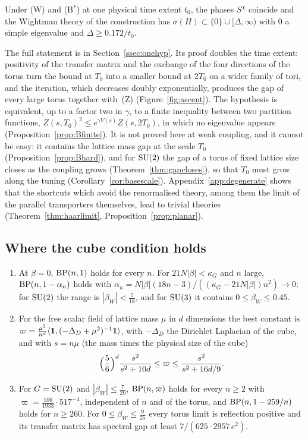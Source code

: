 \begin{mainthmF}
Under \textup{(W)} and \textup{(B$^{*}$)} at one physical time extent $t_0$,
the phases $S^\chi$ coincide and the Wightman theory of the construction has
$\sigma(H)\subset\{0\}\cup[\Delta,\infty)$ with $0$ a simple eigenvalue and
$\Delta\ge0.172/t_0$.
\end{mainthmF}

The full statement is in Section~\ref{ssec:onehyp}. Its proof doubles the
time extent: positivity of the transfer matrix and the exchange of the four
directions of the torus turn the bound at $T_0$ into a smaller bound at
$2T_0$ on a wider family of tori, and the iteration, which decreases doubly
exponentially, produces the gap of every large torus together with~(Z)
(Figure~\ref{fig:ascent}). The hypothesis is equivalent, up to a factor two in $\gamma$, to a finite
inequality between two partition functions,
$Z(s,T_0)^2\le e^{\gamma V(s)}Z(s,2T_0)$, in which no eigenvalue appears
(Proposition~\ref{prop:Bfinite}). It is not proved here at weak coupling,
and it cannot be easy: it contains the lattice mass gap at the scale $T_0$
(Proposition~\ref{prop:Bhard}), and for $\mathrm{SU}(2)$ the gap of a torus of fixed
lattice size closes as the coupling grows (Theorem~\ref{thm:gapcloses}), so
that $T_0$ must grow along the tuning (Corollary~\ref{cor:basescale}).
Appendix~\ref{app:degenerate} shows that the shortcuts which avoid the
renormalised theory, among them the limit of the parallel transporters
themselves, lead to trivial theories (Theorem~\ref{thm:haarlimit},
Proposition~\ref{prop:planar}).

\subsection{Where the cube condition holds}

\begin{mainthm}\label{thm:C}
\begin{enumerate}[label=\textup{(\roman*)},leftmargin=*]
\item At $\beta=0$, $\mathrm{BP}(n,1)$ holds for every $n$. For
$21N|\beta|<\kappa_G$ and $n$ large, $\mathrm{BP}(n,1-\alpha_n)$ holds with
$\alpha_n=N|\beta|(18n-3)/((\kappa_G-21N|\beta|)n^2)\to0$; for $\mathrm{SU}(2)$ the
range is $|\beta_W|<\frac5{18}$, and for $\mathrm{SU}(3)$ it contains
$0\le\beta_W\le0.45$.
\item For the free scalar field of lattice mass $\mu$ in $d$ dimensions the
best constant is
$\varpi=\frac{\mu^2}{n^d}\langle \mathbf 1,(-\Delta_D+\mu^2)^{-1}\mathbf 1\rangle$, with
$-\Delta_D$ the Dirichlet Laplacian of the cube, and with $s=n\mu$ (the mass
times the physical size of the cube)
\[
\Bigl(\frac56\Bigr)^d\frac{s^2}{s^2+10d}\le\varpi\le\frac{s^2}{s^2+16d/9}.
\]
\item For $G=\mathrm{SU}(2)$ and $|\beta_W|\le\frac7{20}$, $\mathrm{BP}(n,\varpi)$ holds for
every $n\ge2$ with $\varpi=\frac{106}{1933}\cdot517^{-4}$, independent of $n$
and of the torus, and $\mathrm{BP}(n,1-259/n)$ holds for $n\ge260$. For
$0\le\beta_W\le\frac9{25}$ every torus limit is reflection positive and its
transfer matrix has spectral gap at least $7/(625\cdot2957\,e^2)$.
\end{enumerate}
\end{mainthm}

